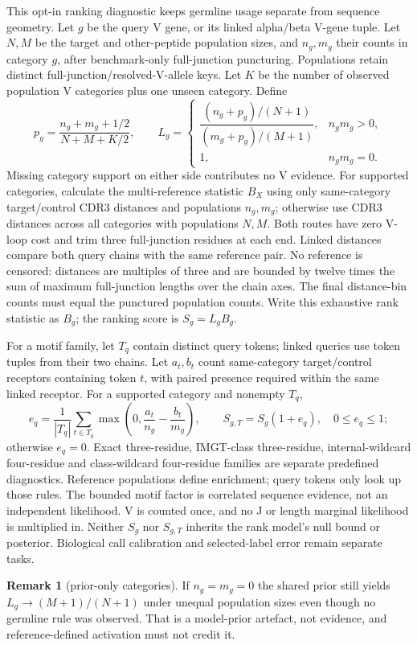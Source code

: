 \documentclass[10pt,a4paper]{article}
\theoremstyle{definition}
\newtheorem{remark}{Remark}
\begin{document}
This opt-in ranking diagnostic keeps germline usage separate from sequence geometry. Let $g$ be the
query V gene, or its linked alpha/beta V-gene tuple. Let $N,M$ be the target and other-peptide
population sizes, and $n_g,m_g$ their counts in category $g$, after benchmark-only full-junction
puncturing. Populations retain distinct full-junction/resolved-V-allele keys. Let $K$ be the number
of observed population V categories plus one unseen category. Define
\[
p_g=\frac{n_g+m_g+1/2}{N+M+K/2},\qquad
L_g=\begin{cases}\dfrac{(n_g+p_g)/(N+1)}{(m_g+p_g)/(M+1)},&n_gm_g>0,\\[4pt] 1,&n_gm_g=0.\end{cases}
\]
Missing category support on either side contributes no V evidence. For supported categories,
calculate the multi-reference statistic $B_X$ using only same-category target/control CDR3 distances
and populations $n_g,m_g$; otherwise use CDR3 distances across all categories with populations
$N,M$. Both routes have zero V-loop cost and trim three full-junction residues at each end. Linked
distances compare both query chains with the same reference pair. No reference is censored:
distances are multiples of three and are bounded by twelve times the sum of maximum full-junction
lengths over the chain axes. The final distance-bin counts must equal the punctured population
counts. Write this exhaustive rank statistic as $B_g$; the ranking score is $S_g=L_gB_g$.

For a motif family, let $T_q$ contain distinct query tokens; linked queries use token tuples from
their two chains. Let $a_t,b_t$ count same-category target/control receptors containing token $t$,
with paired presence required within the same linked receptor. For a supported category and nonempty
$T_q$,
\[
e_q=\frac1{|T_q|}\sum_{t\in T_q}\max\!\left(0,\frac{a_t}{n_g}-\frac{b_t}{m_g}\right),\qquad
S_{g,T}=S_g(1+e_q),\quad 0\le e_q\le1;
\]
otherwise $e_q=0$. Exact three-residue, IMGT-class three-residue, internal-wildcard four-residue and
class-wildcard four-residue families are separate predefined diagnostics. Reference populations
define enrichment; query tokens only look up those rules. The bounded motif factor is correlated
sequence evidence, not an independent likelihood. V is counted once, and no J or length marginal
likelihood is multiplied in. Neither $S_g$ nor $S_{g,T}$ inherits the rank model's null bound or
posterior. Biological call calibration and selected-label error remain separate tasks.

\begin{remark}[prior-only categories]
If $n_g=m_g=0$ the shared prior still yields $L_g\to(M+1)/(N+1)$ under unequal population sizes even
though no germline rule was observed. That is a model-prior artefact, not evidence, and
reference-defined activation must not credit it.
\end{remark}
\end{document}
